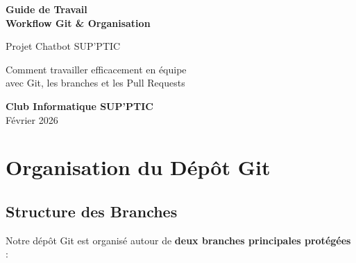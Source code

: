 \documentclass[11pt,a4paper]{article}
\begin{document}
\begin{titlepage}
    \centering
    \vspace*{2cm}
    {\Huge \textbf{Guide de Travail}} \\[0.5cm]
    {\LARGE \textbf{Workflow Git \& Organisation}}
    
    \vspace{1cm}
    
    {\Large Projet Chatbot SUP'PTIC}
    
    \vspace{1.5cm}
    
    \begin{minipage}{0.8\textwidth}
        \centering
        \small Comment travailler efficacement en équipe \\
        avec Git, les branches et les Pull Requests
    \end{minipage}
    
    \vfill
    
    \begin{center}
        \textbf{Club Informatique SUP'PTIC} \\
        Février 2026
    \end{center}
    
\end{titlepage}

\tableofcontents
\clearpage

\section{Organisation du Dépôt Git}
\label{sec:organisation}

\subsection{Structure des Branches}

Notre dépôt Git est organisé autour de \textbf{deux branches principales protégées} :
\end{document}
